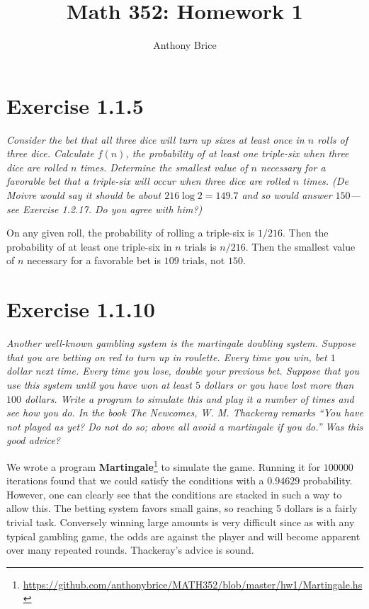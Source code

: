 \documentclass{tufte-handout}
\title{Math 352: Homework 1}
\author{Anthony Brice}
\begin{document}
\maketitle

\section{Exercise 1.1.5}

\emph{Consider the bet that all three dice will turn up sixes at
  least once in $n$ rolls of three dice. Calculate $f(n)$, the
  probability of at least one triple-six when three dice are rolled
  $n$ times. Determine the smallest value of $n$ necessary for a
  favorable bet that a triple-six will occur when three dice are
  rolled $n$ times. (De Moivre would say it should be about
  $216 \log 2 = 149.7$ and so would answer $150$---see Exercise
  1.2.17. Do you agree with him?)}

\bigskip

On any given roll, the probability of rolling a triple-six is
$1/216$. Then the probability of at least one triple-six in $n$ trials
is $n/216$. Then the smallest value of $n$ necessary for a favorable
bet is $109$ trials, not $150$.

\section{Exercise 1.1.10}

\emph{Another well-known gambling system is the martingale doubling
  system. Suppose that you are betting on red to turn up in
  roulette. Every time you win, bet $1$ dollar next time. Every time
  you lose, double your previous bet. Suppose that you use this system
  until you have won at least $5$ dollars or you have lost more than
  $100$ dollars. Write a program to simulate this and play it a number
  of times and see how you do. In the book \emph{The Newcomes},
  W. M. Thackeray remarks ``You have not played as yet?  Do not do so;
  above all avoid a martingale if you do.'' Was this good advice?}

\bigskip

We wrote a program \textbf{Martingale}\footnote{
  \url{https://github.com/anthonybrice/MATH352/blob/master/hw1/Martingale.hs}}
to simulate the game. Running it for $100000$ iterations found that we
could satisfy the conditions with a $0.94629$ probability. However,
one can clearly see that the conditions are stacked in such a way to
allow this. The betting system favors small gains, so reaching 5
dollars is a fairly trivial task. Conversely winning large amounts is
very difficult since as with any typical gambling game, the odds are
against the player and will become apparent over many repeated
rounds. Thackeray's advice is sound.
\end{document}
